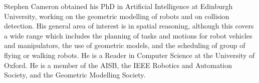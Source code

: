 \documentclass[10pt,twocolumn,twoside]{IEEEtran}
\begin{document}
\begin{IEEEbiography}{Stephen Cameron}
obtained his PhD in Artificial Intelligence at Edinburgh University, working on the geometric modelling of robots and on collision detection. His general area of interest is in spatial reasoning, although this covers a wide range which includes the planning of tasks and motions for robot vehicles and manipulators, the use of geometric models, and the scheduling of group of flying or walking robots. He is a Reader in Computer Science at the University of Oxford. He is a member of the AISB, the IEEE Robotics and Automation Society, and the Geometric Modelling Society.
\end{IEEEbiography}
\end{document}
